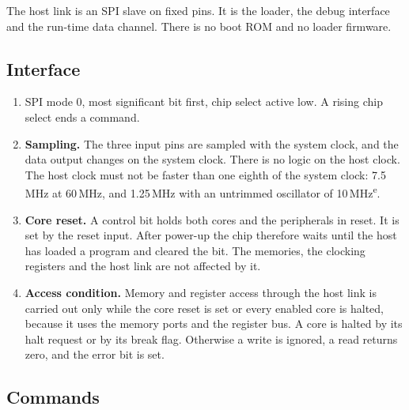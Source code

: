\documentclass[10pt,a4paper]{article}
\newcommand{\est}{\textsuperscript{e}}
\begin{document}
The host link is an SPI slave on fixed pins. It is the loader, the debug interface and the run-time data
channel. There is no boot ROM and no loader firmware.

\subsection{Interface}

\begin{enumerate}[label=\textbf{L\arabic*},leftmargin=2.6em]
\item SPI mode 0, most significant bit first, chip select active low. A rising chip select ends a command.
\item \textbf{Sampling.} The three input pins are sampled with the system clock, and the data output changes
on the system clock. There is no logic on the host clock. The host clock must not be faster than one eighth
of the system clock: 7.5\,MHz at 60\,MHz, and 1.25\,MHz with an untrimmed oscillator of 10\,MHz\est.
\item \textbf{Core reset.} A control bit holds both cores and the peripherals in reset. It is set by the reset input.
After power-up the chip therefore waits until the host has loaded a program and cleared the bit. The memories,
the clocking registers and the host link are not affected by it.
\item \textbf{Access condition.} Memory and register access through the host link is carried out only while the
core reset is set or every enabled core is halted, because it uses the memory ports and the register
bus. A core is halted by its halt request or by its break flag. Otherwise a write is ignored, a read returns
zero, and the error bit is set.
\end{enumerate}

\subsection{Commands}
\end{document}
